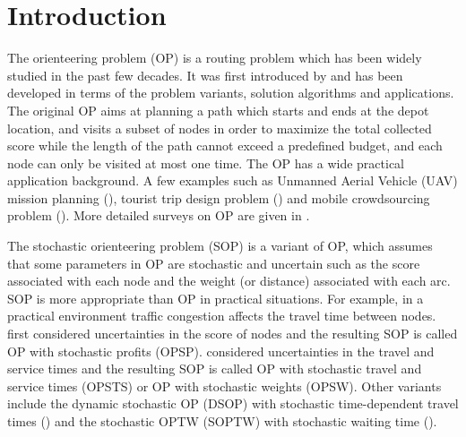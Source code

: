 \documentclass[preprint,review,10pt,round,authoryear]{elsarticle}\usepackage[]{graphicx}\usepackage[]{color}
\theoremstyle{plain}
\theoremstyle{definition}
\theoremstyle{remark}
\begin{document}
\newpage
\section{Introduction}

The orienteering problem (OP) is a routing problem which has been widely studied in the past few decades. It was first introduced by \cite{golden1987orienteering} and has been developed in terms of the problem variants, solution algorithms and applications. The original OP aims at planning a path which starts and ends at the depot location, and visits a subset of nodes in order to maximize the total collected score while the length of the path cannot exceed a predefined budget, and each node can only be visited at most one time. The OP has a wide practical application background. A few examples such as Unmanned Aerial Vehicle (UAV) mission planning (\cite{mufalli2012simultaneous,evers2014robust}), tourist trip design problem (\cite{vansteenwegen2007mobile,gavalas2014survey}) and mobile crowdsourcing problem (\cite{howe2008crowdsourcing,yuen2011survey}). More detailed surveys on OP are given in \cite{vansteenwegen2011orienteering,gunawan2016orienteering}.

The stochastic orienteering problem (SOP) is a variant of OP, which assumes that some parameters in OP are stochastic and uncertain such as the score associated with each node and the weight (or distance) associated with each arc. SOP is more appropriate than OP in practical situations. For example, in a practical environment traffic congestion affects the travel time between nodes. \cite{ilhan2008orienteering} first considered uncertainties in the score of nodes and the resulting SOP is called OP with stochastic profits (OPSP). \cite{campbell2011orienteering,evers2014two} considered uncertainties in the travel and service times and the resulting SOP is called OP with stochastic travel and service times (OPSTS) or OP with stochastic weights (OPSW). Other variants include the dynamic stochastic OP (DSOP) with stochastic time-dependent travel times (\cite{lau2012dynamic,varakantham2013optimization}) and the stochastic OPTW (SOPTW) with stochastic waiting time (\cite{zhang2014priori}).
\end{document}
